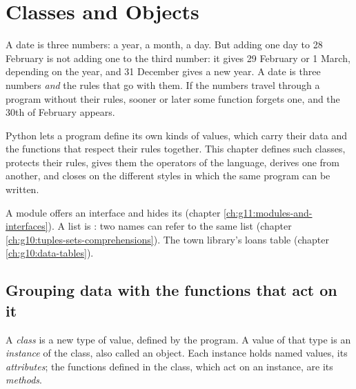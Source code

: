 \chapter{Classes and Objects}\label{ch:g12:classes-and-objects}

A date is three numbers: a year, a month, a day. But adding one day to 28 February is not adding one to the third
number: it gives 29 February or 1 March, depending on the year, and 31 December gives a new year. A date is three
numbers \emph{and} the rules that go with them. If the numbers travel through a program without their rules, sooner
or later some function forgets one, and the 30th of February appears.

Python lets a program define its own kinds of values, which carry their data and the functions that respect their
rules together. This chapter defines such classes, protects their rules, gives them the operators of the language,
derives one  from another, and closes on the different styles in which the same program can be written.

\begin{recall}
A module offers an interface and hides its  (chapter \ref{ch:g11:modules-and-interfaces}). A list is
: two names can refer to the same list (chapter \ref{ch:g10:tuples-sets-comprehensions}). The town library's
loans table (chapter \ref{ch:g10:data-tables}).
\end{recall}

\section{Grouping data with the functions that act on it}\label{sec:g12:classes-and-objects:classes}

\begin{definition}\label{def:g12:classes-and-objects:class}
A \emph{class} is a new type of value, defined by the program. A value of that type is an
\emph{instance} of the class, also called an object. Each instance holds named values, its
\emph{attributes}; the functions defined in the class, which act on an instance, are its
\emph{methods}.
\end{definition}

